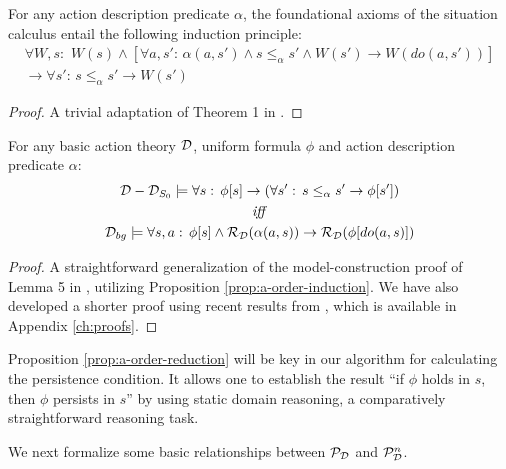 \begin{prop}
For any action description predicate $\alpha$, the foundational axioms
of the situation calculus entail the following induction principle:\label{prop:a-order-induction}\begin{multline*}
\forall W,s:\,\, W(s)\wedge\left[\forall a,s':\,\alpha(a,s')\wedge s\leq_{\alpha}s'\wedge W(s')\rightarrow W(do(a,s'))\right]\\
\rightarrow\forall s':\, s\leq_{\alpha}s'\rightarrow W(s')\end{multline*}

\end{prop}
\begin{proof}
A trivial adaptation of Theorem 1 in \citep{Reiter93proving}. 
\end{proof}
\begin{prop}
For any basic action theory $\mathcal{D}$, uniform formula $\phi$
and action description predicate $\alpha$:\label{prop:a-order-reduction}\begin{gather*}
\mathcal{D}-\mathcal{D}_{S_{0}}\models\forall s:\,\phi[s]\rightarrow\left(\forall s':\, s\leq_{\alpha}s'\rightarrow\phi[s']\right)\\
\mathit{iff}\\
\mathcal{D}_{bg}\models\forall s,a:\,\phi[s]\wedge\mathcal{R}_{\mathcal{D}}(\alpha(a,s))\rightarrow\mathcal{R}_{\mathcal{D}}(\phi[do(a,s)])\end{gather*}

\end{prop}
\begin{proof}
A straightforward generalization of the model-construction proof of
Lemma 5 in \citep{Lin94-StateConstraints}, utilizing Proposition
\ref{prop:a-order-induction}. We have also developed a shorter proof
using recent results from \citep{savelli06sc_quantum_levels}, which
is available in Appendix \ref{ch:proofs}. 
\end{proof}
Proposition \ref{prop:a-order-reduction} will be key in our algorithm
for calculating the persistence condition. It allows one to establish
the result {}``if $\phi$ holds in $s$, then $\phi$ persists in
$s$'' by using static domain reasoning, a comparatively straightforward
reasoning task.

We next formalize some basic relationships between $\mathcal{P}_{\mathcal{D}}$
and $\mathcal{P}_{\mathcal{D}}^{n}$.

